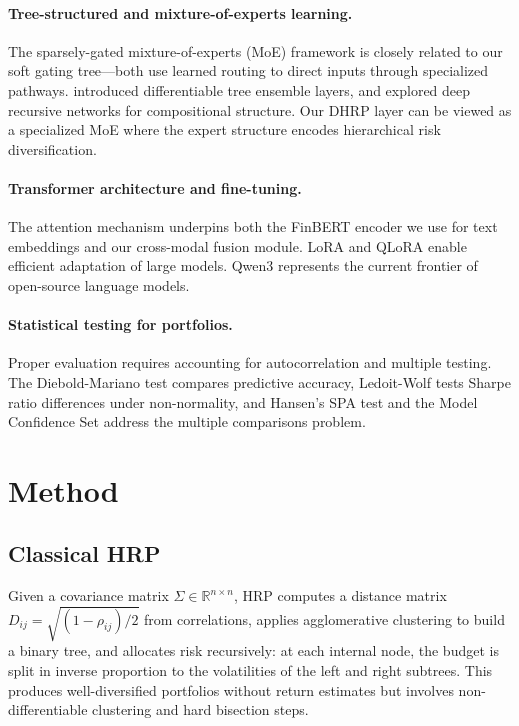 \documentclass[11pt]{article}
\begin{document}
\paragraph{Tree-structured and mixture-of-experts learning.} The sparsely-gated mixture-of-experts (MoE) framework \citep{Shazeer2017} is closely related to our soft gating tree---both use learned routing to direct inputs through specialized pathways. \citet{Hazimeh2020} introduced differentiable tree ensemble layers, and \citet{Irsoy2014} explored deep recursive networks for compositional structure. Our DHRP layer can be viewed as a specialized MoE where the expert structure encodes hierarchical risk diversification.

\paragraph{Transformer architecture and fine-tuning.} The attention mechanism \citep{Vaswani2017} underpins both the FinBERT encoder we use for text embeddings and our cross-modal fusion module. LoRA \citep{Hu2022} and QLoRA \citep{Dettmers2023} enable efficient adaptation of large models. Qwen3 \citep{QwenTeam2025} represents the current frontier of open-source language models.

\paragraph{Statistical testing for portfolios.} Proper evaluation requires accounting for autocorrelation and multiple testing. The Diebold-Mariano test \citep{Diebold1995} compares predictive accuracy, Ledoit-Wolf \citep{Ledoit2008} tests Sharpe ratio differences under non-normality, and Hansen's SPA test \citep{Hansen2005} and the Model Confidence Set \citep{Hansen2011} address the multiple comparisons problem.

\section{Method}

\subsection{Classical HRP}

Given a covariance matrix $\Sigma \in \mathbb{R}^{n \times n}$, HRP computes a distance matrix $D_{ij} = \sqrt{(1 - \rho_{ij})/2}$ from correlations, applies agglomerative clustering to build a binary tree, and allocates risk recursively: at each internal node, the budget is split in inverse proportion to the volatilities of the left and right subtrees. This produces well-diversified portfolios without return estimates but involves non-differentiable clustering and hard bisection steps.
\end{document}
